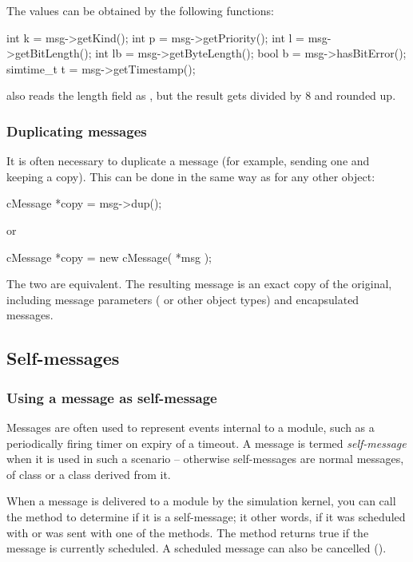 The values can be obtained by the following functions:

\begin{cpp}
int k       = msg->getKind();
int p       = msg->getPriority();
int l       = msg->getBitLength();
int lb      = msg->getByteLength();
bool b      = msg->hasBitError();
simtime_t t = msg->getTimestamp();
\end{cpp}

 also reads the length field as ,
but the result gets divided by 8 and rounded up.


\subsubsection{Duplicating messages}

It is often necessary to duplicate a message (for example, sending
one and keeping a copy). This can be done in the same way as
for any other {\opp} object:

\begin{cpp}
cMessage *copy = msg->dup();
\end{cpp}

or

\begin{cpp}
cMessage *copy = new cMessage( *msg );
\end{cpp}


The two are equivalent. The resulting message is an exact copy
of the original, including message parameters ( or other
object types) and encapsulated messages.


\subsection{Self-messages}

\subsubsection{Using a message as self-message}

Messages are often used to represent events internal to a module,
such as a periodically firing timer on expiry of a timeout.
A message is termed \textit{self-message} when it is used
in such a scenario -- otherwise self-messages are normal messages,
of class  or a class derived from it.

When a message is delivered to a module by the simulation kernel,
you can call the  method to determine if it is
a self-message; it other words, if it was scheduled with
 or was sent with one of the
 methods. The  method
returns true if the message is currently scheduled. A scheduled
message can also be cancelled ().

